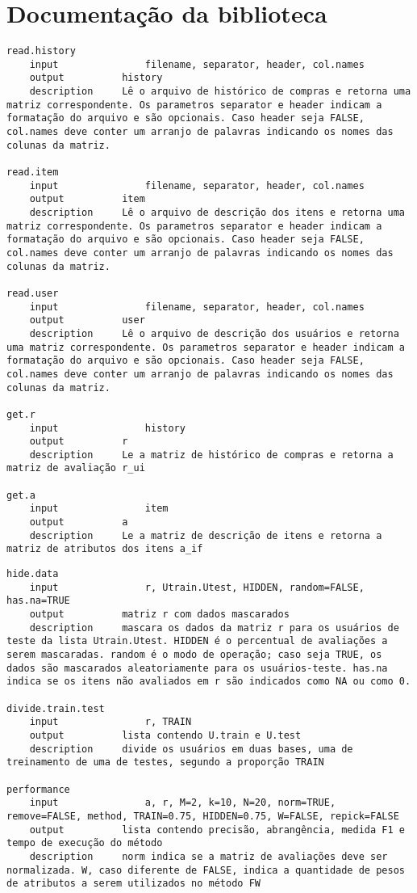 \chapter{Documentação da biblioteca} %
\label{cha:documenta_o_da_biblioteca}

\lstset{language=C}
\begin{lstlisting}[caption=\texttt{setup}.R]
read.history 
	input				filename, separator, header, col.names
	output			history
	description		Lê o arquivo de histórico de compras e retorna uma matriz correspondente. Os parametros separator e header indicam a formatação do arquivo e são opcionais. Caso header seja FALSE, col.names deve conter um arranjo de palavras indicando os nomes das colunas da matriz.

read.item
	input				filename, separator, header, col.names
	output			item
	description		Lê o arquivo de descrição dos itens e retorna uma matriz correspondente. Os parametros separator e header indicam a formatação do arquivo e são opcionais. Caso header seja FALSE, col.names deve conter um arranjo de palavras indicando os nomes das colunas da matriz.

read.user
	input				filename, separator, header, col.names
	output			user
	description		Lê o arquivo de descrição dos usuários e retorna uma matriz correspondente. Os parametros separator e header indicam a formatação do arquivo e são opcionais. Caso header seja FALSE, col.names deve conter um arranjo de palavras indicando os nomes das colunas da matriz.

get.r
	input				history
	output			r
	description		Le a matriz de histórico de compras e retorna a matriz de avaliação r_ui

get.a
	input				item
	output			a
	description		Le a matriz de descrição de itens e retorna a matriz de atributos dos itens a_if
\end{lstlisting}



\begin{lstlisting}[caption=\texttt{performance}.R]
hide.data
	input				r, Utrain.Utest, HIDDEN, random=FALSE, has.na=TRUE 
	output			matriz r com dados mascarados
	description		mascara os dados da matriz r para os usuários de teste da lista Utrain.Utest. HIDDEN é o percentual de avaliações a serem mascaradas. random é o modo de operação; caso seja TRUE, os dados são mascarados aleatoriamente para os usuários-teste. has.na indica se os itens não avaliados em r são indicados como NA ou como 0.

divide.train.test
	input				r, TRAIN
	output			lista contendo U.train e U.test
	description		divide os usuários em duas bases, uma de treinamento de uma de testes, segundo a proporção TRAIN

performance
	input				a, r, M=2, k=10, N=20, norm=TRUE, remove=FALSE, method, TRAIN=0.75, HIDDEN=0.75, W=FALSE, repick=FALSE
	output			lista contendo precisão, abrangência, medida F1 e tempo de execução do método
	description		norm indica se a matriz de avaliações deve ser normalizada. W, caso diferente de FALSE, indica a quantidade de pesos de atributos a serem utilizados no método FW
\end{lstlisting}

